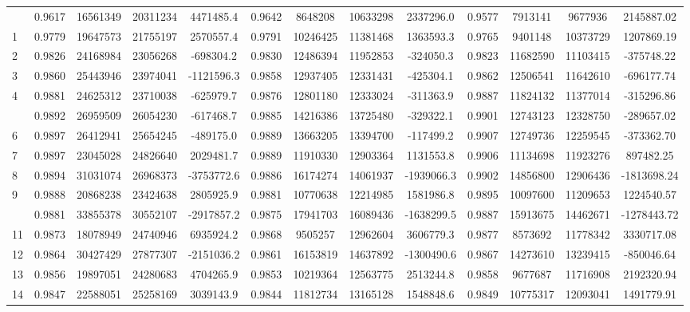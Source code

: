 \documentclass[
  12pt,
]{article}
\begin{document}
\begin{longtable}[t]{lcccccccccccc}
\endfoot
\bottomrule
\endlastfoot
0 & 0.9617 & 16561349 & 20311234 & 4471485.4 & 0.9642 & 8648208 & 10633298 & 2337296.0 & 0.9577 & 7913141 & 9677936 & 2145887.02\\
1 & 0.9779 & 19647573 & 21755197 & 2570557.4 & 0.9791 & 10246425 & 11381468 & 1363593.3 & 0.9765 & 9401148 & 10373729 & 1207869.19\\
2 & 0.9826 & 24168984 & 23056268 & -698304.2 & 0.9830 & 12486394 & 11952853 & -324050.3 & 0.9823 & 11682590 & 11103415 & -375748.22\\
3 & 0.9860 & 25443946 & 23974041 & -1121596.3 & 0.9858 & 12937405 & 12331431 & -425304.1 & 0.9862 & 12506541 & 11642610 & -696177.74\\
4 & 0.9881 & 24625312 & 23710038 & -625979.7 & 0.9876 & 12801180 & 12333024 & -311363.9 & 0.9887 & 11824132 & 11377014 & -315296.86\\
\addlinespace
5 & 0.9892 & 26959509 & 26054230 & -617468.7 & 0.9885 & 14216386 & 13725480 & -329322.1 & 0.9901 & 12743123 & 12328750 & -289657.02\\
6 & 0.9897 & 26412941 & 25654245 & -489175.0 & 0.9889 & 13663205 & 13394700 & -117499.2 & 0.9907 & 12749736 & 12259545 & -373362.70\\
7 & 0.9897 & 23045028 & 24826640 & 2029481.7 & 0.9889 & 11910330 & 12903364 & 1131553.8 & 0.9906 & 11134698 & 11923276 & 897482.25\\
8 & 0.9894 & 31031074 & 26968373 & -3753772.6 & 0.9886 & 16174274 & 14061937 & -1939066.3 & 0.9902 & 14856800 & 12906436 & -1813698.24\\
9 & 0.9888 & 20868238 & 23424638 & 2805925.9 & 0.9881 & 10770638 & 12214985 & 1581986.8 & 0.9895 & 10097600 & 11209653 & 1224540.57\\
\addlinespace
10 & 0.9881 & 33855378 & 30552107 & -2917857.2 & 0.9875 & 17941703 & 16089436 & -1638299.5 & 0.9887 & 15913675 & 14462671 & -1278443.72\\
11 & 0.9873 & 18078949 & 24740946 & 6935924.2 & 0.9868 & 9505257 & 12962604 & 3606779.3 & 0.9877 & 8573692 & 11778342 & 3330717.08\\
12 & 0.9864 & 30427429 & 27877307 & -2151036.2 & 0.9861 & 16153819 & 14637892 & -1300490.6 & 0.9867 & 14273610 & 13239415 & -850046.64\\
13 & 0.9856 & 19897051 & 24280683 & 4704265.9 & 0.9853 & 10219364 & 12563775 & 2513244.8 & 0.9858 & 9677687 & 11716908 & 2192320.94\\
14 & 0.9847 & 22588051 & 25258169 & 3039143.9 & 0.9844 & 11812734 & 13165128 & 1548848.6 & 0.9849 & 10775317 & 12093041 & 1491779.91\\

\end{longtable}
\end{document}
